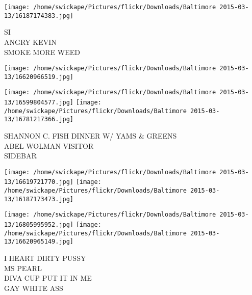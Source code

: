 \documentclass[10pt,letterpaper]{article}
\begin{document}
\texttt{[image: /home/swickape/Pictures/flickr/Downloads/Baltimore 2015-03-13/16187174383.jpg]}

SI\\
ANGRY KEVIN\\
SMOKE MORE WEED
\pagebreak

\texttt{[image: /home/swickape/Pictures/flickr/Downloads/Baltimore 2015-03-13/16620966519.jpg]}

\vspace{0.25in}
\texttt{[image: /home/swickape/Pictures/flickr/Downloads/Baltimore 2015-03-13/16599804577.jpg]}
\texttt{[image: /home/swickape/Pictures/flickr/Downloads/Baltimore 2015-03-13/16781217366.jpg]}

SHANNON C. FISH DINNER W/ YAMS \& GREENS\\
ABEL WOLMAN VISITOR\\
SIDEBAR
\pagebreak

\texttt{[image: /home/swickape/Pictures/flickr/Downloads/Baltimore 2015-03-13/16619721770.jpg]}
\texttt{[image: /home/swickape/Pictures/flickr/Downloads/Baltimore 2015-03-13/16187173473.jpg]}

\texttt{[image: /home/swickape/Pictures/flickr/Downloads/Baltimore 2015-03-13/16805995952.jpg]}
\texttt{[image: /home/swickape/Pictures/flickr/Downloads/Baltimore 2015-03-13/16620965149.jpg]}

I HEART DIRTY PUSSY\\
MS PEARL\\
DIVA CUP PUT IT IN ME\\
GAY WHITE ASS
\pagebreak
\end{document}

